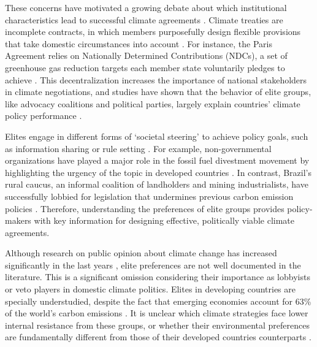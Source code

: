 \documentclass[a4paper,12pt]{article}
\begin{document}
These concerns have motivated a growing debate about which institutional characteristics lead to successful climate agreements \citep[e.g.,][]{aklin2013understanding, bechtel2013mass, bechtel2017interests, keohane2011regime, ostrom2014polycentric}. Climate treaties are incomplete contracts, in which members purposefully design flexible provisions that take domestic circumstances into account \citep[607]{brauninger2000making}. For instance, the Paris Agreement relies on Nationally Determined Contributions (NDCs), a set of greenhouse gas reduction targets each member state voluntarily pledges to achieve \citep{winning2019nationally}. This decentralization increases the importance of national stakeholders in climate negotiations, and studies have shown that the behavior of elite groups, like advocacy coalitions and political parties, largely explain countries' climate policy performance \citep{jahn2016politics, karapin2012explaining}. 

Elites engage in different forms of `societal steering' to achieve policy goals, such as information sharing or rule setting \citep{andonova2009transnational, bulkeley2014transnational}. For example, non-governmental organizations have played a major role in the fossil fuel divestment movement by highlighting the urgency of the topic in developed countries \citep{ayling2017non}. In contrast, Brazil's rural caucus, an informal coalition of landholders and mining industrialists, have successfully lobbied for legislation that undermines previous carbon emission policies \citep{rochedo2018threat, simionatto2012dominantes}. Therefore, understanding the preferences of elite groups provides policy-makers with key information for designing effective, politically viable climate agreements.

Although research on public opinion about climate change has increased significantly in the last years \citep[e.g.,][]{aklin2013understanding, bechtel2013mass, bechtel2017interests, mildenberger2017beliefs}, elite preferences are not well documented in the literature. This is a significant omission considering their importance as lobbyists or veto players in domestic climate politics. Elites in developing countries are specially understudied, despite the fact that emerging economies account for 63\% of the world's carbon emissions \citep{busch2015developing}. It is unclear which climate strategies face lower internal resistance from these groups, or whether their environmental preferences are fundamentally different from those of their developed countries counterparts \citep[28]{aklin2013understanding}.
\end{document}
